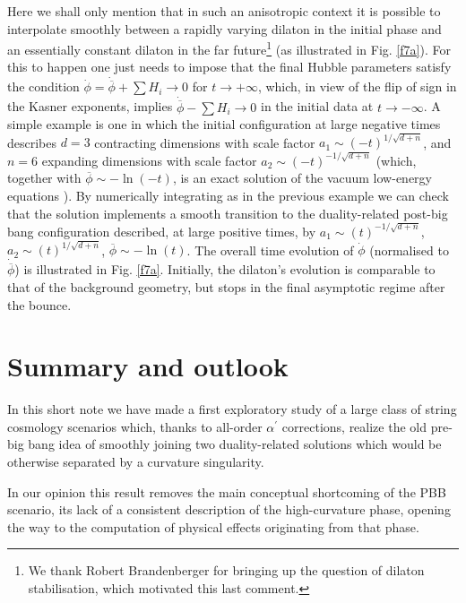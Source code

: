 \documentclass[a4paper,11pt]{article}
\def \ra {\rightarrow}
\def \ap {\alpha^{\prime}}
\def \fb {\overline \phi}
\def \fbp {\dot{\fb}}
\begin{document}
Here we shall only mention that in such an anisotropic context it is possible to interpolate smoothly between a  rapidly varying dilaton in the initial phase and an essentially constant dilaton  in the far future\footnote{We thank Robert Brandenberger for bringing up the question of  dilaton stabilisation, which motivated this last comment.} (as illustrated in Fig. \ref{f7a}). For this to happen one just needs to impose  that the final Hubble parameters satisfy the condition $\dot \phi = \fbp + \sum H_i \to 0$ for $t \ra +\infty$, which, in view of the flip of sign in the Kasner exponents, implies $\fbp - \sum H_i \to 0$ in the initial data at $t \ra -\infty$.  A simple example is one  in which the initial  configuration at large negative times describes $d=3$ contracting dimensions with scale factor $a_1 \sim (-t)^{1/\sqrt{d+n}}$, and $n=6$ expanding dimensions with scale factor $a_2 \sim (-t)^{-1/\sqrt{d+n}}$ (which, together with $\fb \sim - \ln(-t)$, is an exact solution of the vacuum low-energy equations \cite{7,8,9}). By numerically integrating as in the previous example we can check that the solution implements a smooth transition to the duality-related  post-big bang configuration described, at large positive times, by $a_1 \sim (t)^{-1/\sqrt{d+n}}$, $a_2 \sim (t)^{1/\sqrt{d+n}}$, $\fb \sim - \ln(t)$. The overall time evolution of $\dot \phi$ (normalised to $\fbp$) is illustrated in Fig. \ref{f7a}. Initially, the dilaton's evolution is comparable to that of the background geometry,  but stops in the final asymptotic regime after the bounce.




\section{Summary and outlook}
\label{sec4}

In this short note we have made a first exploratory study of a large class of string cosmology scenarios which, thanks to all-order $\ap$ corrections, realize the old pre-big bang idea \cite{5, 7} of smoothly joining two duality-related solutions which would be otherwise separated by a curvature singularity.

In our opinion this result removes the main conceptual shortcoming of the PBB scenario, its lack of a consistent description of the high-curvature phase, opening the way to the computation of physical effects originating from that phase.
\end{document}
